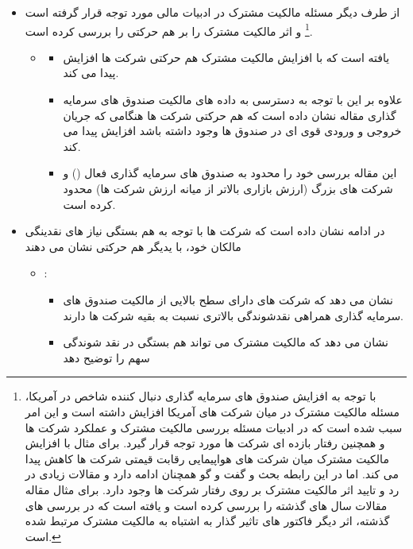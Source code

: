 \documentclass[12pt, a4paper]{article}
\begin{document}
\begin{itemize}
\item 
از طرف دیگر مسئله مالکیت مشترک در ادبیات مالی مورد توجه قرار گرفته است
\footnote{
	با توجه به افزایش صندوق های سرمایه گذاری  دنبال کننده شاخص در آمریکا، مسئله مالکیت مشترک در میان شرکت های آمریکا افزایش داشته است و این امر سبب شده است که در ادبیات مسئله بررسی مالکیت مشترک و عملکرد شرکت ها و همچنین رفتار بازده ای شرکت ها مورد توجه قرار گیرد. 
	برای مثال 
	با افزایش مالکیت مشترک میان شرکت های هواپیمایی رقابت قیمتی شرکت ها کاهش پیدا می کند.  اما در این رابطه بحث و گفت و گو همچنان ادامه دارد و مقالات زیادی در رد و تایید اثر مالکیت مشترک بر روی رفتار شرکت ها وجود دارد. برای مثال مقاله
	مقالات سال های گذشته را بررسی کرده است و یافته است که در بررسی های گذشته، اثر دیگر فاکتور های تاثیر گذار به اشتباه به مالکیت مشترک مرتبط شده است.
}
 و
اثر مالکیت مشترک را بر هم حرکتی را بررسی کرده است.  

\begin{itemize}
\item {}
\begin{itemize}
\item
یافته است که با افزایش مالکیت مشترک هم حرکتی شرکت ها افزایش پیدا می کند. 
\item
علاوه بر این با توجه به دسترسی به داده های مالکیت صندوق های سرمایه گذاری مقاله نشان داده است که هم حرکتی شرکت ها هنگامی که جریان خروجی و ورودی قوی ای در صندوق ها وجود داشته باشد افزایش پیدا می کند. 
\item
این مقاله بررسی خود را محدود به صندوق های سرمایه گذاری فعال 
() 
و شرکت های بزرگ (ارزش بازاری بالاتر از میانه ارزش شرکت ها) محدود کرده است.
\end{itemize}
\end{itemize}
\item
در ادامه 
نشان داده است که شرکت ها با توجه به هم بستگی نیاز های نقدینگی مالکان خود، با یدیگر هم حرکتی نشان می دهند
\begin{itemize}
\item {}:
\begin{itemize} 
\item
 نشان می دهد که شرکت های دارای سطح بالایی از مالکیت صندوق های سرمایه گذاری همراهی نقدشوندگی بالاتری نسبت به بقیه شرکت ها دارند.
 \item
 نشان می دهد که مالکیت مشترک می تواند هم بستگی در نقد شوندگی سهم را توضیح دهد
\end{itemize}
\end{itemize}


\end{itemize}
\end{document}
